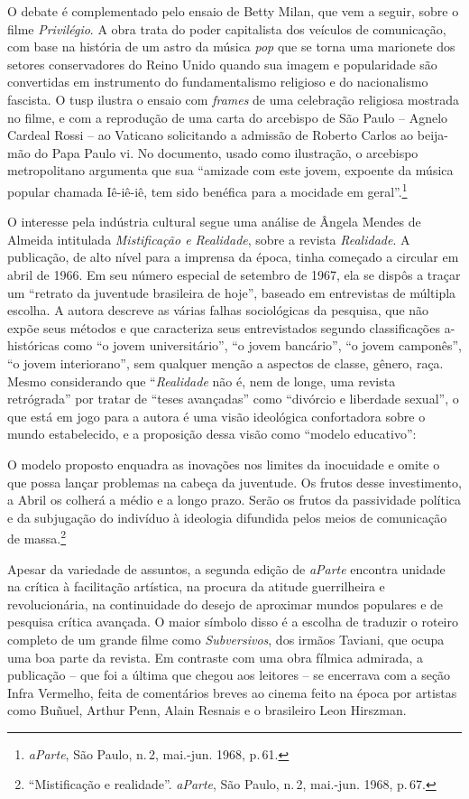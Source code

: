 O debate é complementado pelo ensaio de Betty Milan, que vem a seguir,
sobre o filme {\it Privilégio}. A obra trata do poder capitalista dos
veículos de comunicação, com base na história de um astro da música
{\it pop} que se torna uma marionete dos setores conservadores do Reino
Unido quando sua imagem e popularidade são convertidas em instrumento do
fundamentalismo religioso e do nacionalismo fascista. O {\sc tusp} ilustra o
ensaio com {\it frames} de uma celebração religiosa mostrada no filme, e
com a reprodução de uma carta do arcebispo de São Paulo -- Agnelo Cardeal
Rossi -- ao Vaticano solicitando a admissão de Roberto Carlos ao
beija-mão do Papa Paulo {\sc vi}. No documento, usado como ilustração, o
arcebispo metropolitano argumenta que sua “amizade com este jovem,
expoente da música popular chamada Iê-iê-iê, tem sido benéfica para a
mocidade em geral”.\footnote{{\it aParte}, São Paulo, n.\,2, mai.-jun.
  1968, p.\,61.}

O interesse pela indústria cultural segue uma análise de Ângela Mendes
de Almeida intitulada {\it Mistificação e Realidade}, sobre a revista
{\it Realidade}. A publicação, de alto nível para a imprensa da época,
tinha começado a circular em abril de 1966. Em seu número especial de
setembro de 1967, ela se dispôs a traçar um “retrato da juventude
brasileira de hoje”, baseado em entrevistas de múltipla escolha. A
autora descreve as várias falhas sociológicas da pesquisa, que não expõe
seus métodos e que caracteriza seus entrevistados segundo classificações
a-históricas como “o jovem universitário”, “o jovem bancário”, “o jovem
camponês”, “o jovem interiorano”, sem qualquer menção a aspectos de
classe, gênero, raça. Mesmo considerando que “{\it Realidade} não é, nem
de longe, uma revista retrógrada” por tratar de “teses avançadas” como
“divórcio e liberdade sexual”, o que está em jogo para a autora é uma
visão ideológica confortadora sobre o mundo estabelecido, e a proposição
dessa visão como “modelo educativo”:

\startblockquote
O modelo proposto enquadra as inovações nos limites da inocuidade e
omite o que possa lançar problemas na cabeça da juventude. Os frutos
desse investimento, a Abril os colherá a médio e a longo prazo. Serão os
frutos da passividade política e da subjugação do indivíduo à ideologia
difundida pelos meios de comunicação de massa.\footnote{“Mistificação e
  realidade”. {\it aParte}, São Paulo, n.\,2, mai.-jun. 1968, p.\,67.}
\stopblockquote

Apesar da variedade de assuntos, a segunda edição de {\it aParte}
encontra unidade na crítica à facilitação artística, na procura da
atitude guerrilheira e revolucionária, na continuidade do desejo de
aproximar mundos populares e de pesquisa crítica avançada. O maior
símbolo disso é a escolha de traduzir o roteiro completo de um grande
filme como {\it Subversivos}, dos irmãos Taviani, que ocupa uma boa
parte da revista. Em contraste com uma obra fílmica admirada, a
publicação -- que foi a última que chegou aos leitores -- se encerrava com
a seção Infra Vermelho, feita de comentários breves ao cinema feito na
época por artistas como Buñuel, Arthur Penn, Alain Resnais e o
brasileiro Leon Hirszman.

